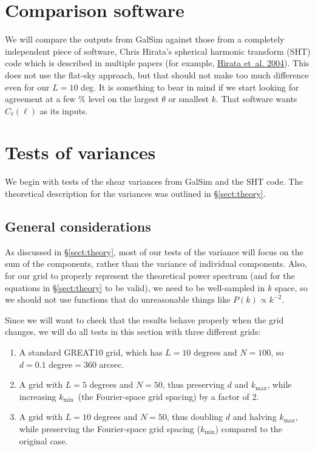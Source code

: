 \documentclass[preprint]{aastex}
\newcommand{\kmax}{\ensuremath{k_\mathrm{max}}}
\newcommand{\kmin}{\ensuremath{k_\mathrm{min}}}
\begin{document}
\section{Comparison software}\label{S:comparison}

We will compare the outputs from GalSim against those from a completely independent piece of software,
Chris Hirata's spherical harmonic transform (SHT) code which is described in
multiple papers (for example,
\href{http://adsabs.harvard.edu/abs/2004PhRvD..70j3501H}{Hirata
  et~al. 2004}).  This does not use the flat-sky
approach, but that should not make too much difference even
for our $L=10$ deg.  It is something to bear in mind if we start
looking for agreement at a few \% level on the largest $\theta$ or
smallest $k$.  That software wants $C_\ell(\ell)$ as its inputs.

\section{Tests of variances}\label{S:testvar}

We begin with tests of the shear variances from GalSim and the SHT
code.  The theoretical 
description for the variances was outlined in \S\ref{sect:theory}.

\subsection{General considerations}

As discussed in \S\ref{sect:theory}, most of our tests of the variance
will focus on the sum of the components, rather than the variance of
individual components.  Also, for our grid to properly represent the
theoretical power spectrum (and for the equations in
\S\ref{sect:theory} to be valid), we need to be well-sampled in $k$
space, so we should not use functions that do unreasonable things like
$P(k)\propto k^{-2}$.

Since we will want to check that the results behave properly when the
grid changes, we will do all tests in this section with three
different grids:
\begin{enumerate}
\item A standard GREAT10 grid, which has $L=10$ degrees and $N=100$,
  so $d=0.1$ degree$=360$ arcsec.
\item A grid with $L=5$ degrees and $N=50$, thus preserving $d$ and
  \kmax, while increasing \kmin\ (the Fourier-space grid spacing) by a
  factor of 2.
\item A grid with $L=10$ degrees and $N=50$, thus doubling $d$ and
  halving \kmax, while preserving the Fourier-space grid spacing
  (\kmin) compared to the original case.
\end{enumerate}
\end{document}
